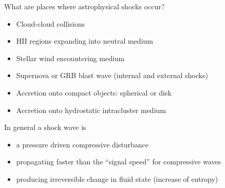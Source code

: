 What are places where astrophysical shocks occur?

\begin{itemize}
\item Cloud-cloud collisions
\item HII regions expanding into neutral medium
\item Stellar wind encountering medium
\item Supernova or GRB blast wave (internal and external shocks)
\item Accretion onto compact objects: spherical or disk
\item Accretion onto hydrostatic intracluster medium
\end{itemize}

In general a shock wave is
\begin{itemize}
\item a pressure driven compressive disturbance
\item propagating faster than the “signal speed” for compressive waves
\item producing irreversible change in fluid state (increase of entropy)
\end{itemize}










